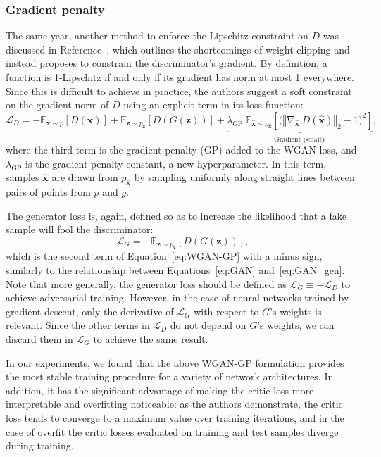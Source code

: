 \subsubsection{Gradient penalty}
The same year, another method to enforce the Lipschitz constraint on $D$ was
discussed in Reference~\cite{NIPS2017_892c3b1c}, which outlines the shortcomings of weight
clipping and instead proposes to constrain the discriminator's gradient. By
definition, a function is 1-Lipschitz if and only if its gradient has norm at
most 1 everywhere. Since this is difficult to achieve in practice, the authors
suggest a soft constraint on the gradient norm of $D$ using an explicit term in
its loss function:
\begin{equation}\label{eq:WGAN-GP}
    \mathcal{L}_D =
    -\mathbb{E}_{\bm{x} \sim p} \left[ D(\bm{x}) \right] +
    \mathbb{E}_{\bm{z} \sim p_{\bm{z}}} \left[ D(G(\bm{z})) \right] +
    \underbrace{\lambda_\mathrm{GP}\ \mathbb{E}_{\hat{\bm{x}} \sim p_{\hat{\bm{x}}}}
    \left[ \big( \left\Vert \nabla_{\hat{\bm{x}}}\ D(\hat{\bm{x}}) \right\Vert_2 - 1 \big) ^2 \right]}_\textrm{Gradient penalty},
\end{equation}
where the third term is the gradient penalty (GP) added to the WGAN loss, and
$\lambda_\mathrm{GP}$ is the gradient penalty constant, a new hyperparameter. In
this term, samples $\hat{\bm{x}}$ are drawn from $p_{\hat{\bm{x}}}$ by
sampling uniformly along straight lines between pairs of points from $p$ and
$g$.

The generator loss is, again, defined so as to increase the likelihood that a
fake sample will fool the discriminator:
\begin{equation}\label{eq:WGAN-GP_gen}
    \mathcal{L}_G =
    -\mathbb{E}_{\bm{z} \sim p_{\bm{z}}} \left[ D(G(\bm{z})) \right],
\end{equation}
which is the second term of Equation~\ref{eq:WGAN-GP} with a minus sign, similarly to
the relationship between Equations~\ref{eq:GAN} and~\ref{eq:GAN_gen}. Note that more
generally, the generator loss should be defined as $\mathcal{L}_G \equiv
-\mathcal{L}_D$ to achieve adversarial training. However, in the case of neural
networks trained by gradient descent, only the derivative of $\mathcal{L}_G$
with respect to $G$'s weights is relevant. Since the other terms in
$\mathcal{L}_D$ do not depend on $G$'s weights, we can discard them in
$\mathcal{L}_G$ to achieve the same result.

In our experiments, we found that the above WGAN-GP formulation provides the
most stable training procedure for a variety of network architectures. In
addition, it has the significant advantage of making the critic loss more
interpretable and overfitting noticeable: as the authors demonstrate, the critic
loss tends to converge to a maximum value over training iterations, and in the
case of overfit the critic losses evaluated on training and test samples
diverge during training.

